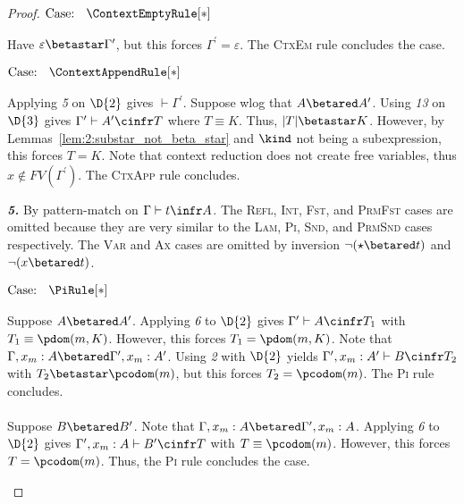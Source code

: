 \begin{proof}
    $\text{Case: }\begin{array}{c} \ContextEmptyRule[*] \end{array}$
    \begin{proofcase}
        Have $\varepsilon \betastar \Gamma^\prime$, but this forces $\Gamma^\prime = \varepsilon$.
        The \textsc{CtxEm} rule concludes the case.
    \end{proofcase}

    $\text{Case: }\begin{array}{c} \ContextAppendRule[*] \end{array}$
    \begin{proofcase}
        Applying \textit{5} on $\D{2}$ gives $\vdash \Gamma^\prime$.
        Suppose wlog that $A \betared A^\prime$.
        Using \textit{13} on $\D{3}$ gives $\Gamma^\prime \vdash A^\prime \cinfr T$ where $T \equiv K$.
        Thus, $|T| \betastar K$.
        However, by Lemmas~\ref{lem:2:substar_not_beta_star} and $\kind$ not being a subexpression, this forces $T = K$.
        Note that context reduction does not create free variables, thus $x \notin FV(\Gamma^\prime)$.
        The \textsc{CtxApp} rule concludes.
    \end{proofcase}

    \noindent \textbf{\textit{5.}}
    By pattern-match on $\Gamma \vdash t \infr A$.
    The \textsc{Refl}, \textsc{Int}, \textsc{Fst}, and \textsc{PrmFst} cases are omitted because they are very similar to the \textsc{Lam}, \textsc{Pi}, \textsc{Snd}, and \textsc{PrmSnd} cases respectively.
    The \textsc{Var} and \textsc{Ax} cases are omitted by inversion $\neg (\star \betared t)$ and $\neg (x \betared t)$.

    $\text{Case: }\begin{array}{c} \PiRule[*] \end{array}$
    \begin{proofcase}
        Suppose $A \betared A^\prime$.
        Applying \textit{6} to $\D{2}$ gives $\Gamma^\prime \vdash A \cinfr T_1$ with $T_1 \equiv \pdom(m, K)$.
        However, this forces $T_1 = \pdom(m, K)$.
        Note that $\Gamma, x_m : A \betared \Gamma^\prime, x_m : A^\prime$.
        Using \textit{2} with $\D{2}$ yields $\Gamma^\prime, x_m : A^\prime \vdash B \cinfr T_2$ with $T_2 \betastar \pcodom(m)$, but this forces $T_2 = \pcodom(m)$.
        The \textsc{Pi} rule concludes.
        \\ \\
        Suppose $B \betared B^\prime$.
        Note that $\Gamma, x_m : A \betared \Gamma^\prime, x_m : A$.
        Applying \textit{6} to $\D{2}$ gives $\Gamma^\prime, x_m : A \vdash B^\prime \cinfr T$ with $T \equiv \pcodom(m)$.
        However, this forces $T = \pcodom(m)$.
        Thus, the \textsc{Pi} rule concludes the case.
    \end{proofcase}


\end{proof}
